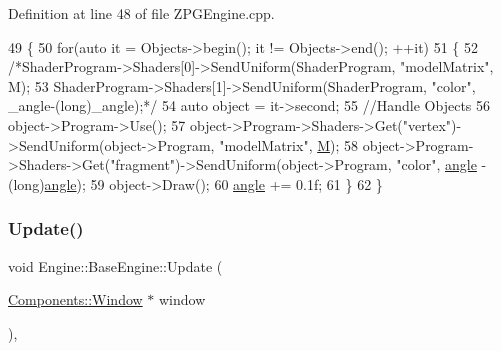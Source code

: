 Definition at line 48 of file Z\+P\+G\+Engine.\+cpp.


\begin{DoxyCode}
49 \{
50     \textcolor{keywordflow}{for}(\textcolor{keyword}{auto} it = Objects->begin(); it != Objects->end(); ++it)
51     \{
52         \textcolor{comment}{/*ShaderProgram->Shaders[0]->SendUniform(ShaderProgram, "modelMatrix", M);}
53 \textcolor{comment}{        ShaderProgram->Shaders[1]->SendUniform(ShaderProgram, "color", \_angle-(long)\_angle);*/}
54         \textcolor{keyword}{auto} \textcolor{keywordtype}{object} = it->second;
55         \textcolor{comment}{//Handle Objects}
56         \textcolor{keywordtype}{object}->Program->Use();
57         \textcolor{keywordtype}{object}->Program->Shaders->Get(\textcolor{stringliteral}{"vertex"})->SendUniform(object->Program, \textcolor{stringliteral}{"modelMatrix"}, 
      \mbox{\hyperlink{classApplication_1_1Engines_1_1ZPGEngine_a6e982d6b97e8d538cdf8df9a7f4c6cd0}{M}});
58         \textcolor{keywordtype}{object}->Program->Shaders->Get(\textcolor{stringliteral}{"fragment"})->SendUniform(object->Program, \textcolor{stringliteral}{"color"}, 
      \mbox{\hyperlink{classApplication_1_1Engines_1_1ZPGEngine_adee8aa02ea2c15751eb6222bded1f729}{angle}} - (\textcolor{keywordtype}{long})\mbox{\hyperlink{classApplication_1_1Engines_1_1ZPGEngine_adee8aa02ea2c15751eb6222bded1f729}{angle}});
59         \textcolor{keywordtype}{object}->Draw();
60         \mbox{\hyperlink{classApplication_1_1Engines_1_1ZPGEngine_adee8aa02ea2c15751eb6222bded1f729}{angle}} += 0.1f;
61     \}
62 \}
\end{DoxyCode}
\mbox{\label{classEngine_1_1BaseEngine_a01c23c2073f08939a660f3b7a866852c}} 
\subsubsection{\texorpdfstring{Update()}{Update()}\hspace{0.1cm}{\footnotesize\ttfamily [2/2]}}
{\footnotesize\ttfamily void Engine\+::\+Base\+Engine\+::\+Update (\begin{DoxyParamCaption}\item[{\mbox{\hyperlink{classEngine_1_1Components_1_1Window}{Components\+::\+Window}} $\ast$}]{window }\end{DoxyParamCaption})\hspace{0.3cm}{\ttfamily [virtual]}, {\ttfamily [inherited]}}



